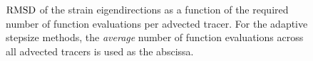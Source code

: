 \begin{figure}[htpb]
    \centering
    
    \caption[$\rmsd$ of the strain eigendirections as a function of the required
    number of function evaluations per advected tracer]{
    $\rmsd$ of the strain eigendirections as a function of the required number
    of function evaluations per advected tracer. For the adaptive stepsize methods, the
    \emph{average} number of function evaluations across all advected tracers
    is used as the abscissa.}
    \label{fig:xi2_err_both}
\end{figure}
